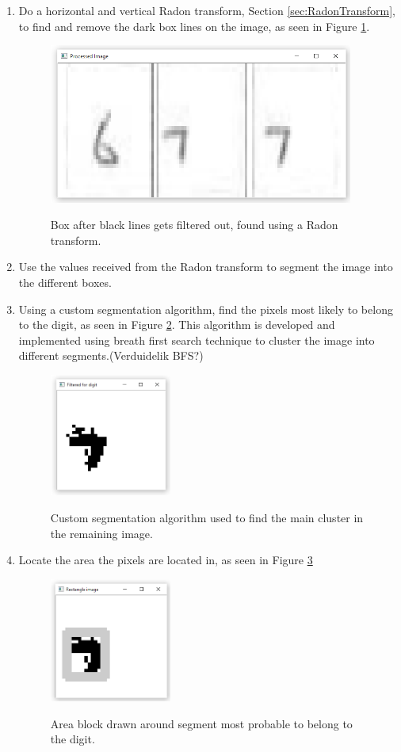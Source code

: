 \begin{enumerate}
\item Do a horizontal and vertical Radon transform, Section \ref{sec:RadonTransform}, to find and remove the dark box lines on the image, as seen in Figure \ref{fig:ar}.

\begin{figure}
  \centering
  \includegraphics[width=10cm]{AfterRadon}\\
  \caption{Box after black lines gets filtered out, found using a Radon transform.}
  \label{fig:ar}
\end{figure}

\item Use the values received from the Radon transform to segment the image into the different boxes.
\item Using a custom segmentation algorithm, find the pixels most likely to belong to the digit, as seen in Figure \ref{fig:c}. This algorithm is developed and implemented using breath first search technique to cluster the image into different segments.(Verduidelik BFS?)

\begin{figure}
  \centering
  \includegraphics[width=4cm]{Cluster}\\
  \caption{Custom segmentation algorithm used to find the main cluster in the remaining image.}
  \label{fig:c}
\end{figure}

\item Locate the area the pixels are located in, as seen in Figure \ref{fig:areaLoc}

\begin{figure}
  \centering
  \includegraphics[width=4cm]{DetectArea}\\
  \caption{Area block drawn around segment most probable to belong to the digit.}
  \label{fig:areaLoc}
\end{figure}


\end{enumerate}
